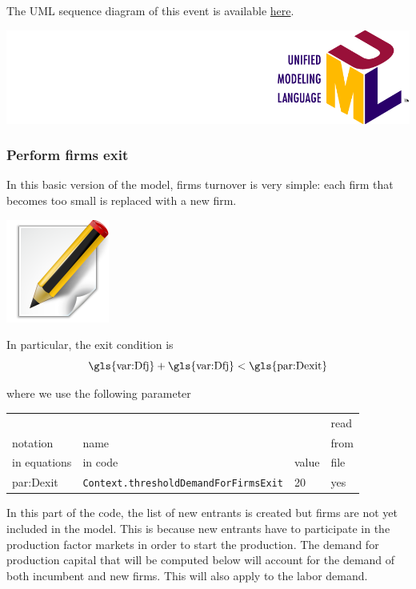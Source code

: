 \documentclass{book}
\newcommand{\doclocation}{file:///Users/giulioni/Documents/workspace/gabriele/docs}
\begin{document}
\vskip3mm



The UML sequence diagram of this event is available \href{\doclocation/umldoc/computeEconomicResultAndCapitalDepreciation.html}{here}.
\begin{marginfigure}
	\includegraphics[scale=0.1]{uml.png}
\end{marginfigure}


\subsubsection{Perform firms exit}

In this basic version of the model, firms turnover is very simple: each firm that becomes too small is replaced with a new firm.
\begin{marginfigure}
	\hskip2.5cm\includegraphics[scale=0.2]{edit.png}
\end{marginfigure}

In particular, the exit condition is
\[
	\textnormal{\gls{var:Dfj}}+\textnormal{\gls{var:Dfj}}<\textnormal{\gls{par:Dexit}}
\]

where we use the following parameter 

\noindent
\begin{tabular}{l l l l}
	\hline
	& &&read\\
	notation& name &&from\\
	in equations& in code&value&file\\
	\hline
	\hline
\gls{par:Dexit}&\verb+Context.thresholdDemandForFirmsExit+&20&yes\\
	\hline
\end{tabular}

\vskip3mm


In this part of the code, the list of new entrants is created but firms are not yet included in the model. This is because new entrants have to participate in the production factor markets in order to start the production. %
The demand for production capital that will be computed below will account for the demand of both incumbent and new firms. This will also apply to the labor demand.
\end{document}
